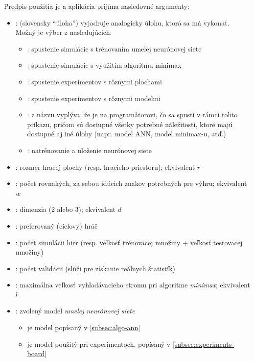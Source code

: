 Predpis použitia je  a aplikácia prijíma nasledovné
argumenty:
\begin{itemize}
    \item {}: (slovensky \enquote{úloha}) vyjadruje analogicky úlohu, ktorá sa má vykonať.
    Možný je výber z nasledujúcich:
    \begin{itemize}
        \item {}: spustenie simulácie s trénovaním umelej neurónovej siete
        \item {}: spustenie simulácie s využitím algoritmu minimax
        \item {}: spustenie experimentov s rôznymi plochami
        \item {}: spustenie experimentov s rôznymi modelmi
        \item {}: z názvu vyplýva, že je na programátorovi, čo sa spustí v rámci tohto príkazu, pričom sú
        dostupné všetky potrebné náležitosti, ktoré majú dostupné aj iné úlohy (napr. model ANN, model minimax-u, atď.)
        \item {}: natrénovanie a uloženie neurónovej siete
    \end{itemize}
    \item {}: rozmer hracej plochy (resp. hracieho priestoru); ekvivalent $r$
    \item {}: počet rovnakých, za sebou idúcich znakov potrebných pre výhru; ekvivalent $w$
    \item {}: dimenzia (2 alebo 3); ekvivalent $d$
    \item {}: preferovaný (cieľový) hráč
    \item {}: počet simulácii hier (resp. veľkosť trénovacej množiny +
    veľkosť testovacej množiny)
    \item {}: počet validácii (slúži pre získanie reálnych štatistík)
    \item {}: maximálna veľkosť vyhľadávacieho stromu pri algoritme \emph{minimax};
    ekvivalent $l$
    \item {}: zvolený model \emph{umelej neurónovej siete}
    \begin{itemize}
        \item {} je model popísaný v \autoref{subsec:algo-ann}
        \item {} je model použitý pri experimentoch, popísaný v \autoref{subsec:experiments-board}
    \end{itemize}
\end{itemize}

